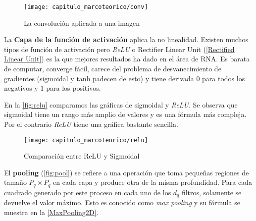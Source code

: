 

\begin{figure}[H]
    \centering
    \texttt{[image: capitulo\_marcoteorico/conv]}
    \caption{La convolución aplicada a una imagen}\label{fig:conv}
\end{figure}

La \textbf{Capa de la función de activación} aplica la no linealidad. Existen
muchos tipos de función de activación pero \emph{ReLU} o Rectifier Linear Unit
(\autoref{Rectified Linear Unit}) es la que mejores resultados ha dado en el
área de RNA. Es barata de computar, converge fácil, carece del problema de
desvanecimiento de gradientes (sigmoidal y tanh padecen de esto) y tiene
derivada 0 para todos los negativos y 1 para los positivos.



En la \autoref{fig:relu} comparamos las gráficas de sigmoidal y \emph{ReLU}. Se
observa que sigmoidal tiene un rango más amplio de valores y es una fórmula más
compleja. Por el contrario \emph{ReLU} tiene una gráfica bastante sencilla.

\begin{figure}[H]
    \centering
    \texttt{[image: capitulo\_marcoteorico/relu]}
    \caption{Comparación entre ReLU y Sigmoidal}\label{fig:relu}
\end{figure}

El \textbf{pooling} (\autoref{fig:pool}) se refiere a una operación que toma
pequeñas regiones de tamaño \(P_{q} \times P_{q}\) en cada capa y produce otra de
la misma profundidad. Para cada cuadrado generado por este proceso en cada uno
de los \(d_{q}\) filtros, solamente se devuelve el valor máximo. Esto es conocido
como \emph{max pooling} y su fórmula se muestra en la \autoref{MaxPooling2D}.

